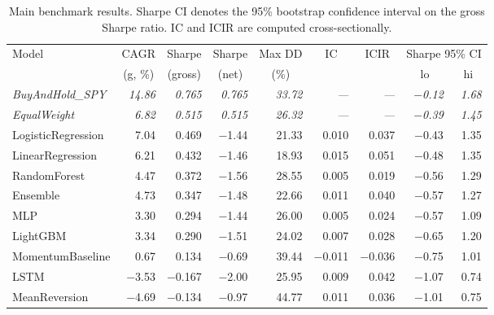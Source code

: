 \documentclass[11pt]{article}
\begin{document}
\begin{table}[H]
\centering
\caption{Main benchmark results. Sharpe CI denotes the 95\% bootstrap confidence interval on the gross Sharpe ratio. IC and ICIR are computed cross-sectionally.}
\label{tab:main}
\footnotesize
\begin{tabular}{l r r r r r r r r}
\toprule
Model & \multicolumn{1}{c}{CAGR} & \multicolumn{1}{c}{Sharpe} & \multicolumn{1}{c}{Sharpe} & \multicolumn{1}{c}{Max DD} & \multicolumn{1}{c}{IC} & \multicolumn{1}{c}{ICIR} & \multicolumn{2}{c}{Sharpe 95\% CI} \\
      & \multicolumn{1}{c}{(g, \%)} & \multicolumn{1}{c}{(gross)} & \multicolumn{1}{c}{(net)} & \multicolumn{1}{c}{(\%)} & & & \multicolumn{1}{c}{lo} & \multicolumn{1}{c}{hi} \\
\midrule
\textit{BuyAndHold\_SPY} & \textit{14.86} & \textit{0.765} & \textit{0.765} & \textit{33.72} & \textit{---} & \textit{---} & \textit{$-$0.12} & \textit{1.68} \\
\textit{EqualWeight} & \textit{6.82} & \textit{0.515} & \textit{0.515} & \textit{26.32} & \textit{---} & \textit{---} & \textit{$-$0.39} & \textit{1.45} \\
\midrule
LogisticRegression  & 7.04  & 0.469 & $-$1.44 & 21.33 & 0.010 & 0.037 & $-$0.43 & 1.35 \\
LinearRegression    & 6.21  & 0.432 & $-$1.46 & 18.93 & 0.015 & 0.051 & $-$0.48 & 1.35 \\
RandomForest        & 4.47  & 0.372 & $-$1.56 & 28.55 & 0.005 & 0.019 & $-$0.56 & 1.29 \\
Ensemble            & 4.73  & 0.347 & $-$1.48 & 22.66 & 0.011 & 0.040 & $-$0.57 & 1.27 \\
MLP                 & 3.30  & 0.294 & $-$1.44 & 26.00 & 0.005 & 0.024 & $-$0.57 & 1.09 \\
LightGBM            & 3.34  & 0.290 & $-$1.51 & 24.02 & 0.007 & 0.028 & $-$0.65 & 1.20 \\
MomentumBaseline    & 0.67  & 0.134 & $-$0.69 & 39.44 & $-$0.011 & $-$0.036 & $-$0.75 & 1.01 \\
LSTM                & $-$3.53 & $-$0.167 & $-$2.00 & 25.95 & 0.009 & 0.042 & $-$1.07 & 0.74 \\
MeanReversion       & $-$4.69 & $-$0.134 & $-$0.97 & 44.77 & 0.011 & 0.036 & $-$1.01 & 0.75 \\
\bottomrule
\end{tabular}
\end{table}
\end{document}
